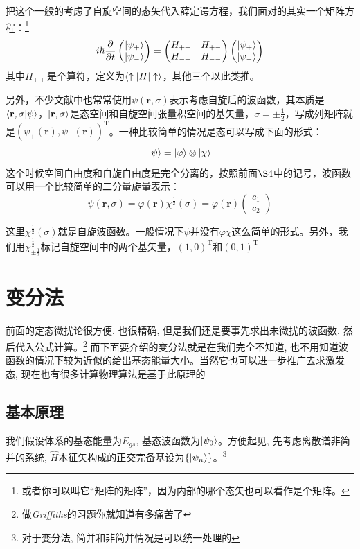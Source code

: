 \documentclass[a4paper,zihao=-4,linespread=1]{ctexrep}
\begin{document}
	把这个一般的考虑了自旋空间的态矢代入薛定谔方程，我们面对的其实一个矩阵方程：\footnote{或者你可以叫它“矩阵的矩阵”，因为内部的哪个态矢也可以看作是个矩阵。}
	\begin{equation}
		i\hbar\frac{\partial}{\partial {t}}\begin{pmatrix}
			\ket{\psi_+}\\ \ket{\psi_-}
		\end{pmatrix}=\begin{pmatrix}
			H_{++}&H_{+-}\\H_{-+}&H_{--}
		\end{pmatrix}\begin{pmatrix}
	\ket{\psi_+}\\ \ket{\psi_-}
	\end{pmatrix}
	\end{equation}
	其中$H_{++}$是个算符，定义为$\braket{\uparrow|H|\uparrow}$，其他三个以此类推。
	
	另外，不少文献中也常常使用$\psi(\mathbf{r},\sigma)$表示考虑自旋后的波函数，其本质是$\braket{\mathbf{r},\sigma|\psi}$，$\ket{\mathbf{r},\sigma}$是态空间和自旋空间张量积空间的基矢量，$\sigma=\pm\frac{1}{2}$，写成列矩阵就是$\left(\psi_+(\mathbf{r}),\psi_-(\mathbf{r})\right)^\mathrm{T}$。一种比较简单的情况是态可以写成下面的形式：
	\[\ket{\psi}=\ket{\varphi}\otimes\ket{\chi}\]
	这个时候空间自由度和自旋自由度是完全分离的，按照前面$\S 4$中的记号，波函数可以用一个比较简单的二分量旋量表示：
	\[\psi(\mathbf{r},\sigma)=\varphi(\mathbf{r})\chi^\frac{1}{2}(\sigma)=\varphi(\mathbf{r})\begin{pmatrix}
		c_1\\
		c_2
	\end{pmatrix}\]
	
	这里$\chi^\frac{1}{2}(\sigma)$就是自旋波函数。一般情况下$\psi$并没有$\varphi\chi$这么简单的形式。另外，我们用$\chi^\frac{1}{2}_{\pm\frac{1}{2}}$标记自旋空间中的两个基矢量，$(1,0)^\mathrm{T}$和$(0,1)^\mathrm{T}$
    \chapter{变分法}
    前面的定态微扰论很方便, 也很精确, 但是我们还是要事先求出未微扰的波函数, 然后代入公式计算。\footnote{做{\itshape Griffiths}的习题你就知道有多痛苦了}
    而下面要介绍的变分法就是在我们完全不知道, 也不用知道波函数的情况下较为近似的给出基态能量大小。当然它也可以进一步推广去求激发态, 现在也有很多计算物理算法是基于此原理的

    \section{基本原理}
    我们假设体系的基态能量为$E_{gs}$, 基态波函数为$\ket{\psi_{0}}$。方便起见, 先考虑离散谱非简并的系统, $\hat{H}$本征矢构成的正交完备基设为$\{\ket{\psi_n}\}$。\footnote{对于变分法, 简并和非简并情况是可以统一处理的}
\end{document}
